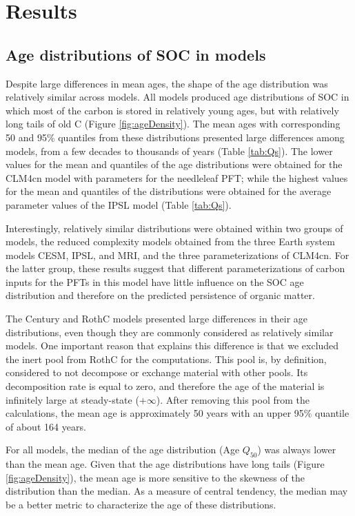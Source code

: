 \documentclass[draft,linenumbers]{agujournal}
\begin{document}
\section{Results}
\subsection{Age distributions of SOC in models}
Despite large differences in mean ages, the shape of the age distribution was relatively similar across models. All models produced age distributions of SOC in which most of the carbon is stored in relatively young ages, but with relatively long tails of old C (Figure \ref{fig:ageDensity}). The mean ages with corresponding 50 and 95\% quantiles from these distributions presented large differences among models, from a few decades to thousands of years (Table \ref{tab:Qs}). The lower values for the mean and quantiles of the age distributions were obtained for the CLM4cn model with parameters for the needleleaf PFT; while the highest values for the mean and quantiles of the distributions were obtained for the average parameter values of the IPSL model (Table \ref{tab:Qs}).

Interestingly, relatively similar distributions were obtained within two groups of models, the reduced complexity models obtained from the three Earth system models CESM, IPSL, and MRI, and the three parameterizations of CLM4cn. For the latter group, these results suggest that different parameterizations of carbon inputs for the  PFTs in this model have little influence on the SOC age distribution and therefore on the predicted persistence of organic matter.

The Century and RothC models presented large differences in their age distributions, even though they are commonly considered as relatively similar models. One important reason that explains this difference is that we excluded the inert pool from RothC for the computations. This pool is, by definition, considered to not decompose or exchange material with other pools. Its decomposition rate is equal to zero, and therefore the age of the material is infinitely large at steady-state ($+ \infty$). After removing this pool from the calculations, the mean age is approximately 50 years with an upper 95\% quantile of about 164 years. 

For all models, the median of the age distribution (Age $Q_{50}$) was always lower than the mean age. Given that the age distributions have long tails (Figure \ref{fig:ageDensity}), the mean age is more sensitive to the skewness of the distribution than the median. As a measure of central tendency, the median may be a better
metric to characterize the age of these distributions. 
\end{document}
